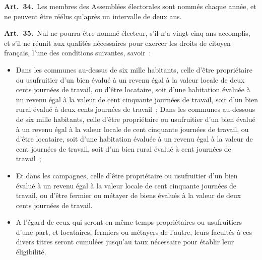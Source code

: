 \documentclass[french,twoside]{book} %
\newcommand{\labelchar}[1]{\textbf{\color{rubric} #1}}
\begin{document}
\labelchar{Art. 34.} Les membres des Assemblées électorales sont nommés chaque année, et ne peuvent être réélus qu’après un intervalle de deux ans.\par
\labelchar{Art. 35.} Nul ne pourra être nommé électeur, s’il n’a vingt-cinq ans accomplis, et s’il ne réunit aux qualités nécessaires pour exercer les droits de citoyen français, l’une des conditions suivantes, savoir :\par

\begin{itemize}[itemsep=0pt,topsep=0pt,partopsep=0pt,parskip=0pt]
\item Dans les communes au-dessus de six mille habitants, celle d’être propriétaire ou usufruitier d’un bien évalué à un revenu égal à la valeur locale de deux cents journées de travail, ou d’être locataire, soit d’une habitation évaluée à un revenu égal à la valeur de cent cinquante journées de travail, soit d’un bien rural évalué à deux cents journées de travail ; Dans les communes au-dessous de six mille habitants, celle d’être propriétaire ou usufruitier d’un bien évalué à un revenu égal à la valeur locale de cent cinquante journées de travail, ou d’être locataire, soit d’une habitation évaluée à un revenu égal à la valeur de cent journées de travail, soit d’un bien rural évalué à cent journées de travail ;
\item Et dans les campagnes, celle d’être propriétaire ou usufruitier d’un bien évalué à un revenu égal à la valeur locale de cent cinquante journées de travail, ou d’être fermier ou métayer de biens évalués à la valeur de deux cents journées de travail.
\item A l’égard de ceux qui seront en même temps propriétaires ou usufruitiers d’une part, et locataires, fermiers ou métayers de l’autre, leurs facultés à ces divers titres seront cumulées jusqu’au taux nécessaire pour établir leur éligibilité.
\end{itemize}
\end{document}
